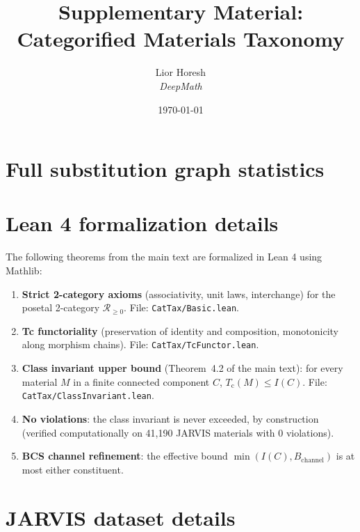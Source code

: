 \documentclass[12pt,a4paper]{article}
\title{Supplementary Material:\\Categorified Materials Taxonomy}
\author{Lior Horesh\\\textit{DeepMath}}
\date{\today}
\newcommand{\Tc}{T_{\mathrm{c}}}
\begin{document}
\maketitle

\section{Full substitution graph statistics}


\section{Lean 4 formalization details}

The following theorems from the main text are formalized in Lean 4
using Mathlib:

\begin{enumerate}
  \item \textbf{Strict 2-category axioms} (associativity, unit laws,
    interchange) for the posetal 2-category $\mathscr{R}_{\geq 0}$.
    File: \texttt{CatTax/Basic.lean}.

  \item \textbf{Tc functoriality} (preservation of identity and
    composition, monotonicity along morphism chains).
    File: \texttt{CatTax/TcFunctor.lean}.

  \item \textbf{Class invariant upper bound} (Theorem~4.2 of the main
    text): for every material $M$ in a finite connected component $C$,
    $\Tc(M) \leq I(C)$.
    File: \texttt{CatTax/ClassInvariant.lean}.

  \item \textbf{No violations}: the class invariant is never exceeded,
    by construction (verified computationally on 41{,}190 JARVIS
    materials with 0 violations).

  \item \textbf{BCS channel refinement}: the effective bound
    $\min(I(C), B_{\mathrm{channel}})$ is at most either constituent.
\end{enumerate}

\section{JARVIS dataset details}

\end{document}
